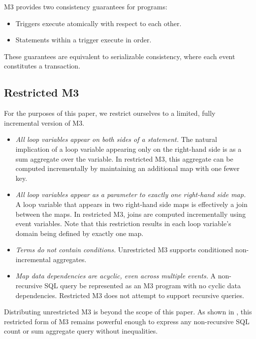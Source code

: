 \documentclass{vldb}
\begin{document}
M3 provides two consistency guarantees for programs:
\begin{itemize}
\item Triggers execute atomically with respect to each other.
\item Statements within a trigger execute in order.
\end{itemize}
These guarantees are equivalent to serializable consistency, where each event constitutes a transaction.


\subsection{Restricted M3}

For the purposes of this paper, we restrict ourselves to a limited, fully incremental version of M3.  
\begin{itemize}
\item \textit{All loop variables appear on both sides of a statement.}  The natural implication of a loop variable appearing only on the right-hand side is as a sum aggregate over the variable.  In restricted M3, this aggregate can be computed incrementally by maintaining an additional map with one fewer key.
\item \textit{All loop variables appear as a parameter to exactly one right-hand side map.}  A loop variable that appears in two right-hand side maps is effectively a join between the maps.  In restricted M3, joins are computed incrementally using event variables.  Note that this restriction results in each loop variable's domain being defined by exactly one map.
\item \textit{Terms do not contain conditions.}  Unrestricted M3 supports conditioned non-incremental aggregates.
\item \textit{Map data dependencies are acyclic, even across multiple events.} A non-recursive SQL query be represented as an M3 program with no cyclic data dependencies.  Restricted M3 does not attempt to support recursive queries.
\end{itemize}

Distributing unrestricted M3 is beyond the scope of this paper.  As shown in \cite{dbtoaster-pods}, this restricted form of M3 remains powerful enough to express any non-recursive SQL count or sum aggregate query without inequalities.  
\end{document}
